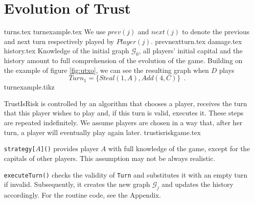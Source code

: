 \section{Evolution of Trust}
  {turns.tex}
  {turnexample.tex}
  We use $prev\left(j\right)$ and $next\left(j\right)$ to denote the previous and next turn respectively played by
  $Player(j)$. %
  {prevnextturn.tex}
  {damage.tex}
  {history.tex}
  Knowledge of the initial graph $\mathcal{G}_0$, all players' initial capital and the history amount to full comprehension of
  the evolution of the game. Building on the example of figure \ref{fig:utxo}, we can see the resulting graph when $D$ plays
  \begin{equation}
  \label{turnexample}
     Turn_1 = \{Steal\left(1, A\right), Add\left(4, C\right)\} \enspace.
  \end{equation}
  {turnexample.tikz}

  TrustIsRisk is controlled by an algorithm that chooses a player, receives the turn that
  this player wishes to play and, if this turn is valid, executes it. These steps are repeated indefinitely. We assume
  players are chosen in a way that, after her turn, a player will eventually play again later.
  {trustisriskgame.tex}

  \texttt{strategy[}$A$\texttt{]()} provides player $A$ with full knowledge of the game, except for the capitals of other
  players. This assumption may not be always realistic.

  \texttt{executeTurn()} checks the validity of \texttt{Turn} and substitutes it with an empty turn if invalid.
  Subsequently, it creates the new graph $\mathcal{G}_j$ and updates the history accordingly. For the routine code,
  see the Appendix.

